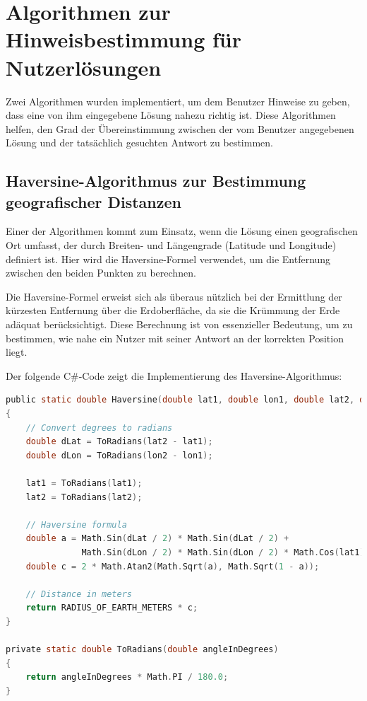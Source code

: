 
\section{Algorithmen zur Hinweisbestimmung für Nutzerlösungen}

Zwei Algorithmen wurden implementiert, um dem Benutzer Hinweise zu geben, dass eine von ihm eingegebene Lösung nahezu richtig ist. Diese Algorithmen helfen, den Grad der Übereinstimmung zwischen der vom Benutzer angegebenen Lösung und der tatsächlich gesuchten Antwort zu bestimmen.

\subsection{Haversine-Algorithmus zur Bestimmung geografischer Distanzen}

Einer der Algorithmen kommt zum Einsatz, wenn die Lösung einen geografischen Ort umfasst, der durch Breiten- und Längengrade (Latitude und Longitude) definiert ist. Hier wird die Haversine-Formel verwendet, um die Entfernung zwischen den beiden Punkten zu berechnen.

Die Haversine-Formel erweist sich als überaus nützlich bei der Ermittlung der kürzesten Entfernung über die Erdoberfläche, da sie die Krümmung der Erde adäquat berücksichtigt. Diese Berechnung ist von essenzieller Bedeutung, um zu bestimmen, wie nahe ein Nutzer mit seiner Antwort an der korrekten Position liegt.

Der folgende C\#-Code zeigt die Implementierung des Haversine-Algorithmus:

\begin{lstlisting}[language=c, caption={Code Ausschnitt zum Haversine Algorithmus in C\#}]
public static double Haversine(double lat1, double lon1, double lat2, double lon2)
{
    // Convert degrees to radians
    double dLat = ToRadians(lat2 - lat1);
    double dLon = ToRadians(lon2 - lon1);

    lat1 = ToRadians(lat1);
    lat2 = ToRadians(lat2);

    // Haversine formula
    double a = Math.Sin(dLat / 2) * Math.Sin(dLat / 2) +
               Math.Sin(dLon / 2) * Math.Sin(dLon / 2) * Math.Cos(lat1) * Math.Cos(lat2);
    double c = 2 * Math.Atan2(Math.Sqrt(a), Math.Sqrt(1 - a));

    // Distance in meters
    return RADIUS_OF_EARTH_METERS * c;
}

private static double ToRadians(double angleInDegrees)
{
    return angleInDegrees * Math.PI / 180.0;
}
\end{lstlisting}

